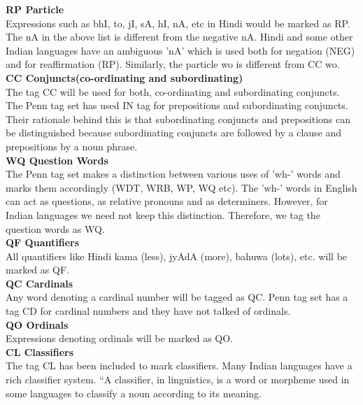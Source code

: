 \documentclass[12pt,a4paper,oneside]{memoir}
\begin{document}
\textbf{RP Particle }\\

Expressions such as bhI, to, jI, sA, hI, nA, etc in Hindi would be marked as RP.
The nA in the above list is different from the negative nA. Hindi and some other
Indian languages have an ambiguous 'nA' which is used both for negation
(NEG) and for reaffirmation (RP). Similarly, the particle wo is different from
CC wo. \\

\textbf{CC Conjuncts(co-ordinating and subordinating) }\\

The tag CC will be used for both, co-ordinating and subordinating conjuncts.
The Penn tag set has used IN tag for prepositions and subordinating conjuncts.
Their rationale behind this is that subordinating conjuncts and prepositions can
be distinguished because subordinating conjuncts are followed by a clause and
prepositions by a noun phrase. \\

\textbf{ WQ Question Words }\\

The Penn tag set makes a distinction between various uses of 'wh-' words and
marks them accordingly (WDT, WRB, WP, WQ etc). The 'wh-' words in
English can act as questions, as relative pronouns and as determiners. However,
for Indian languages we need not keep this distinction. Therefore, we tag the
question words as WQ. \\

\textbf{QF Quantifiers }\\

All quantifiers like Hindi kama (less), jyAdA (more), bahuwa (lots), etc. will be
marked as QF. \\

\textbf{QC Cardinals }\\

Any word denoting a cardinal number will be tagged as QC. Penn tag set has a
tag CD for cardinal numbers and they have not talked of ordinals. \\

\textbf{ QO Ordinals }\\

Expressions denoting ordinals will be marked as QO.\\

\textbf{ CL Classifiers }\\

The tag CL has been included to mark classifiers. Many Indian languages have
a rich classifier system. “A classifier, in linguistics, is a word or morpheme
used in some languages to classify a noun according to its meaning.\\
\end{document}
